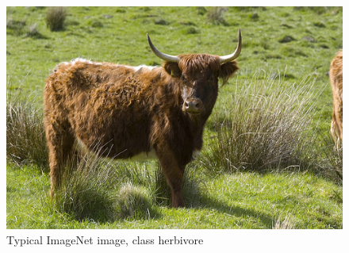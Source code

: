 \documentclass[times, utf8, diplomski]{fer}
\begin{document}
\begin{figure}
  \includegraphics[scale=0.55]{figures/typical_imagenet.jpg}
  \centering
  \caption{Typical ImageNet image, class herbivore}
  \label{fig:typical_imagenet_example}
\end{figure}
\end{document}

